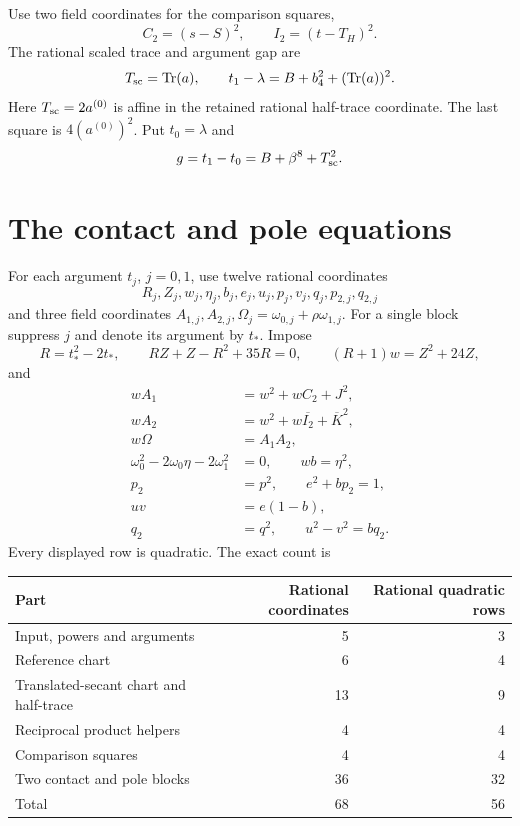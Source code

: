 \documentclass[11pt,a4paper]{article}
\DeclareMathOperator{\Tr}{Tr}\DeclareMathOperator{\Nm}{Nm}
\begin{document}
Use two field coordinates for the comparison squares,
\begin{equation}\label{eq:comparisons}
                         C_2=(s-S)^2,\qquad I_2=(t-T_H)^2.
\end{equation}
The rational scaled trace and argument gap are
\begin{equation}\label{eq:gap}
 T_{\rm sc}=\Tr(a),\qquad
 t_1-\lambda=B+b_4^2+(\Tr(a))^2.
\end{equation}
Here $T_{\rm sc}=2a^{(0)}$ is affine in the retained rational
half-trace coordinate. The last square is $4(a^{(0)})^2$. Put $t_0=\lambda$ and
\[
                    g=t_1-t_0=B+\beta^8+T_{\rm sc}^2.
\]

\section{The contact and pole equations}
For each argument $t_j$, $j=0,1$, use twelve rational coordinates
\[
 R_j,Z_j,w_j,\eta_j,b_j,e_j,u_j,p_j,v_j,q_j,p_{2,j},q_{2,j}
\]
and three field coordinates
$A_{1,j},A_{2,j},\Omega_j=\omega_{0,j}+\rho\omega_{1,j}$.
For a single block suppress $j$ and denote its argument by $t_*$.
Impose
\begin{equation}\label{eq:contactrows}
 R=t_*^2-2t_*,\qquad RZ+Z-R^2+35R=0,\qquad
                         (R+1)w=Z^2+24Z,
\end{equation}
and
\begin{align}
 wA_1&=w^2+wC_2+J^2,\label{eq:factor1}\\
 wA_2&=w^2+w\overline{I_2}+\overline K^2,\label{eq:factor2}\\
 w\Omega&=A_1A_2,\label{eq:product}\\
 \omega_0^2-2\omega_0\eta-2\omega_1^2&=0,
                    \qquad wb=\eta^2,\label{eq:tracepole}\\
 p_2&=p^2,\qquad e^2+bp_2=1,\label{eq:pole1}\\
 uv&=e(1-b),\label{eq:pole2}\\
 q_2&=q^2,\qquad u^2-v^2=bq_2.\label{eq:pole3}
\end{align}
Every displayed row is quadratic. The exact count is
\begin{center}
\begin{tabular}{lrr}
\toprule
Part & Rational coordinates & Rational quadratic rows\\
\midrule
Input, powers and arguments &5&3\\
Reference chart &6&4\\
Translated-secant chart and half-trace &13&9\\
Reciprocal product helpers &4&4\\
Comparison squares &4&4\\
Two contact and pole blocks &36&32\\
\midrule
Total &68&56\\
\bottomrule
\end{tabular}
\end{center}
\end{document}
